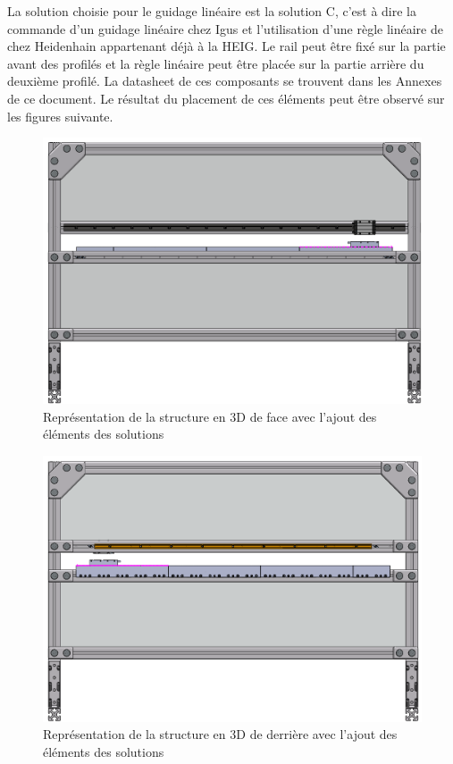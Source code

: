 La solution choisie pour le guidage linéaire est la solution C, c'est à dire la commande d'un guidage linéaire chez Igus \cite{Igus} et l'utilisation d'une
règle linéaire de chez Heidenhain \cite{Heidenhain} appartenant déjà à la HEIG. Le rail peut être fixé sur la partie avant des profilés et la règle linéaire peut
être placée sur la partie arrière du deuxième profilé. La datasheet de ces composants se trouvent dans les Annexes de ce document. Le résultat du placement de ces
éléments peut être observé sur les figures suivante.

\begin{figure}[H]
  \centering
  \includegraphics[width = \textwidth]{assets/figures/VueFace.png}
  \caption{Représentation de la structure en 3D de face avec l'ajout des éléments des solutions}
  \label{fig:VueFace}
\end{figure}

\begin{figure}[H]
  \centering
  \includegraphics[width = \textwidth]{assets/figures/VueDerriere.png}
  \caption{Représentation de la structure en 3D de derrière avec l'ajout des éléments des solutions}
  \label{fig:VueDerriere}
\end{figure}

